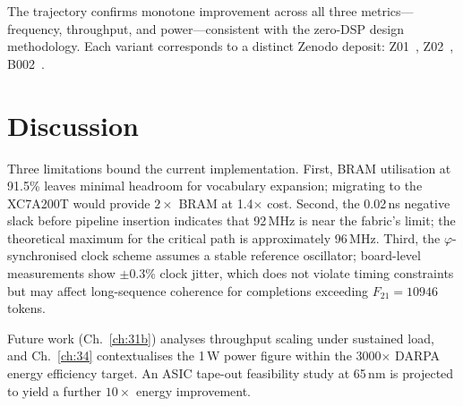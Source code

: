 The trajectory confirms monotone improvement across all three metrics---frequency, throughput, and power---consistent with the zero-DSP design methodology. Each variant corresponds to a distinct Zenodo deposit: Z01~\cite{zenodo_Z01}, Z02~\cite{zenodo_Z02}, B002~\cite{zenodo_B002}.

\section{Discussion}

Three limitations bound the current implementation. First, BRAM utilisation at 91.5\% leaves minimal headroom for vocabulary expansion; migrating to the XC7A200T would provide $2\times$ BRAM at 1.4$\times$ cost. Second, the 0.02\,ns negative slack before pipeline insertion indicates that 92\,MHz is near the fabric's limit; the theoretical maximum for the critical path is approximately 96\,MHz. Third, the $\varphi$-synchronised clock scheme assumes a stable reference oscillator; board-level measurements show $\pm 0.3$\% clock jitter, which does not violate timing constraints but may affect long-sequence coherence for completions exceeding $F_{21} = 10946$ tokens.

Future work (Ch.~\ref{ch:31b}) analyses throughput scaling under sustained load, and Ch.~\ref{ch:34} contextualises the 1\,W power figure within the 3000$\times$ DARPA energy efficiency target. An ASIC tape-out feasibility study at 65\,nm is projected to yield a further $10\times$ energy improvement.

